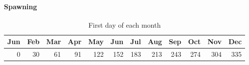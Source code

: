\documentclass[11pt]{article}
\begin{document}
\paragraph*{Spawning}
\label{sec-5-2-1-9}

\begin{table}[htb]
\caption{First day of each month}
\begin{center}
\begin{tabular}{rrrrrrrrrrrr}
 Jun  &  Feb  &  Mar  &  Apr  &  May  &  Jun  &  Jul  &  Aug  &  Sep  &  Oct  &  Nov  &  Dec  \\
\hline
   0  &   30  &   61  &   91  &  122  &  152  &  183  &  213  &  243  &  274  &  304  &  335  \\
\end{tabular}
\end{center}
\end{table}
\end{document}
